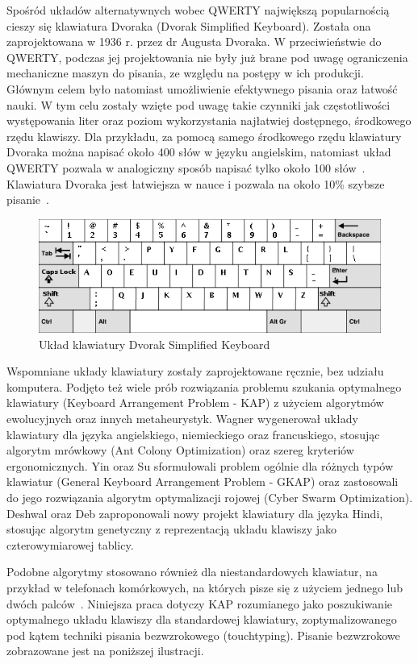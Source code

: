 \documentclass[brudnopis]{xmgr}
\begin{document}
Spośród układów alternatywnych wobec QWERTY największą popularnością cieszy się klawiatura Dvoraka (Dvorak Simplified Keyboard). Została ona zaprojektowana w 1936 r. przez dr Augusta Dvoraka. W przeciwieństwie do QWERTY, podczas jej projektowania nie były już brane pod uwagę ograniczenia mechaniczne maszyn do pisania, ze względu na postępy w ich produkcji. Głównym celem było natomiast umożliwienie efektywnego pisania oraz łatwość nauki. W tym celu zostały wzięte pod uwagę takie czynniki jak częstotliwości występowania liter oraz poziom wykorzystania najłatwiej dostępnego, środkowego rzędu klawiszy. Dla przykładu, za pomocą samego środkowego rzędu klawiatury Dvoraka można napisać około 400 słów w języku angielskim, natomiast układ QWERTY pozwala w analogiczny sposób napisać tylko około 100 słów~\cite{Call:2005:CME}. Klawiatura Dvoraka jest łatwiejsza w nauce i pozwala na około 10\% szybsze pisanie~\cite{Norman:1988:DOET}.

\begin{figure}[!tbh]
\centering
\includegraphics[width=.8\hsize]{fig/dvorak}
\caption{Układ klawiatury Dvorak Simplified Keyboard}
\end{figure}

Wspomniane układy klawiatury zostały zaprojektowane ręcznie, bez udziału komputera. Podjęto też wiele prób rozwiązania problemu szukania optymalnego klawiatury (Keyboard Arrangement Problem - KAP) z użyciem algorytmów ewolucyjnych oraz innych metaheurystyk. Wagner \cite{AntColony:2002:ACO} wygenerował układy klawiatury dla języka angielskiego, niemieckiego oraz francuskiego, stosując algorytm mrówkowy (Ant Colony Optimization) oraz szereg kryteriów ergonomicznych. Yin oraz Su \cite{Swarm:2011:CSOGKAP} sformułowali problem ogólnie dla różnych typów klawiatur (General Keyboard Arrangement Problem - GKAP) oraz zastosowali do jego rozwiązania algorytm optymalizacji rojowej (Cyber Swarm Optimization). Deshwal oraz Deb \cite{Hindi} zaproponowali nowy projekt klawiatury dla języka Hindi, stosując algorytm genetyczny z reprezentacją układu klawiszy jako czterowymiarowej tablicy.

Podobne algorytmy stosowano również dla niestandardowych klawiatur, na przykład w telefonach komórkowych, na których pisze się z użyciem jednego lub dwóch palców~\cite{Li2006695}. Niniejsza praca dotyczy KAP rozumianego jako poszukiwanie optymalnego układu klawiszy dla standardowej klawiatury, zoptymalizowanego pod kątem techniki pisania bezwzrokowego (touchtyping). Pisanie bezwzrokowe zobrazowane jest na poniższej ilustracji.
\end{document}

